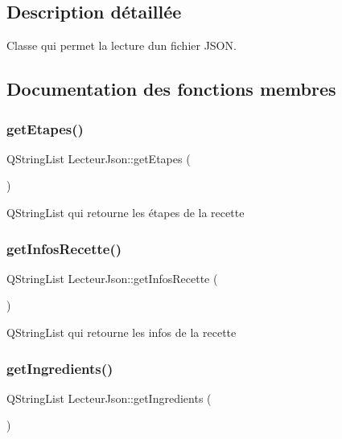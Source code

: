 \subsection{Description détaillée}
Classe qui permet la lecture d\textquotesingle{}un fichier J\+S\+ON. 

\subsection{Documentation des fonctions membres}
\mbox{\label{class_lecteur_json_ab698142bf586bb224c35962525ce3915}} 
\subsubsection{\texorpdfstring{get\+Etapes()}{getEtapes()}}
{\footnotesize\ttfamily Q\+String\+List Lecteur\+Json\+::get\+Etapes (\begin{DoxyParamCaption}{ }\end{DoxyParamCaption})\hspace{0.3cm}{\ttfamily [inline]}}

Q\+String\+List qui retourne les étapes de la recette \mbox{\label{class_lecteur_json_a0c507870050e16de3688d310d1f3b65a}} 
\subsubsection{\texorpdfstring{get\+Infos\+Recette()}{getInfosRecette()}}
{\footnotesize\ttfamily Q\+String\+List Lecteur\+Json\+::get\+Infos\+Recette (\begin{DoxyParamCaption}{ }\end{DoxyParamCaption})\hspace{0.3cm}{\ttfamily [inline]}}

Q\+String\+List qui retourne les infos de la recette \mbox{\label{class_lecteur_json_a0c18d502de54aea85b4d76f1b2858423}} 
\subsubsection{\texorpdfstring{get\+Ingredients()}{getIngredients()}}
{\footnotesize\ttfamily Q\+String\+List Lecteur\+Json\+::get\+Ingredients (\begin{DoxyParamCaption}{ }\end{DoxyParamCaption})\hspace{0.3cm}{\ttfamily [inline]}}

